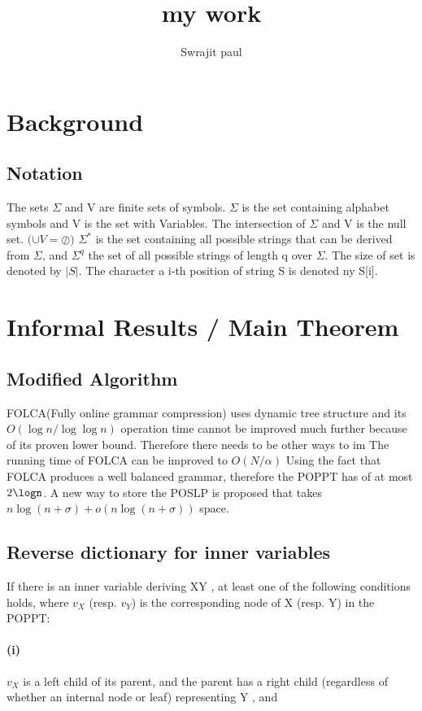 \documentclass[a4paper,portrait,10pt,onecolumn]{article}
\title{my work}
\author{Swrajit paul}
\begin{document}
	\maketitle
	\newpage
	
	\section{Background}
		\subsection{Notation}
			The sets $\Sigma$ and V are finite sets of symbols. $\Sigma$ is the set containing alphabet symbols and V is the set with Variables. The intersection of $\Sigma$ and V is the null set. $($\Sigma$ \cup V =\oslash)$ $\Sigma^{*}$ is the set containing all possible strings that can be derived from $\Sigma$, and $\Sigma^{q}$ the set of all possible strings of length q over $\Sigma$. The size of set is denoted by $|S|$. The character a i-th position of string S is denoted ny S[i].
	\section{Informal Results / Main Theorem}
		\subsection{Modified Algorithm}
			\begin{flushleft}
				FOLCA(Fully online grammar compression) uses dynamic tree structure and its $ O(\log n / \log \log n)$ operation time cannot be improved much further because of its proven lower bound. Therefore there needs to be other ways to im
				The running time of FOLCA can be improved to $O(N/\alpha)$ Using the fact that FOLCA produces a
				well balanced grammar, therefore the POPPT has of at most $2\logn$.
				A new way to store the POSLP is proposed that takes $n\log(n+\sigma) + o(n\log(n+\sigma))$ space.
				
				
			\end{flushleft}
			
		
		\subsection{Reverse dictionary for inner variables}
			If there is an inner variable deriving XY , at least one of the following conditions holds, where $v_X$  (resp. $v_Y$) is the corresponding node of X (resp. Y) in the POPPT:
			\paragraph{(i)}
				$v_X$ is a left child of its parent, and the parent has a right child (regardless of whether an internal node or leaf) representing Y , and
\end{document}
